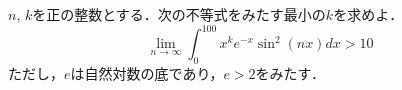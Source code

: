 \documentclass[../../main.tex]{subfiles}
\begin{document}
$n, \, k$を正の整数とする．次の不等式をみたす最小の$k$を求めよ．
\[ \lim_{n\to\infty}\int_0^{100}x^ke^{-x}\sin^2(nx)dx>10 \]
ただし，$e$は自然対数の底であり，$e>2$をみたす．
\end{document}
